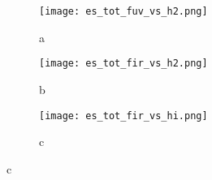 \documentclass[useAMS,usenatbib]{mn2e}
\begin{document}
\begin{figure}
\begin{subfigure}
  \centering
  \texttt{[image: es\_tot\_fuv\_vs\_h2.png]}
  \caption{a}
  \label{fig:sfig1}
\end{subfigure}%
\begin{subfigure}
  \centering
  \texttt{[image: es\_tot\_fir\_vs\_h2.png]}
  \caption{b}
  \label{fig:sfig2}
\end{subfigure}
\begin{subfigure}
  \centering
  \texttt{[image: es\_tot\_fir\_vs\_hi.png]}
  \caption{c}
  \label{fig:sfig2}
\end{subfigure}
\end{figure}
\end{document}
